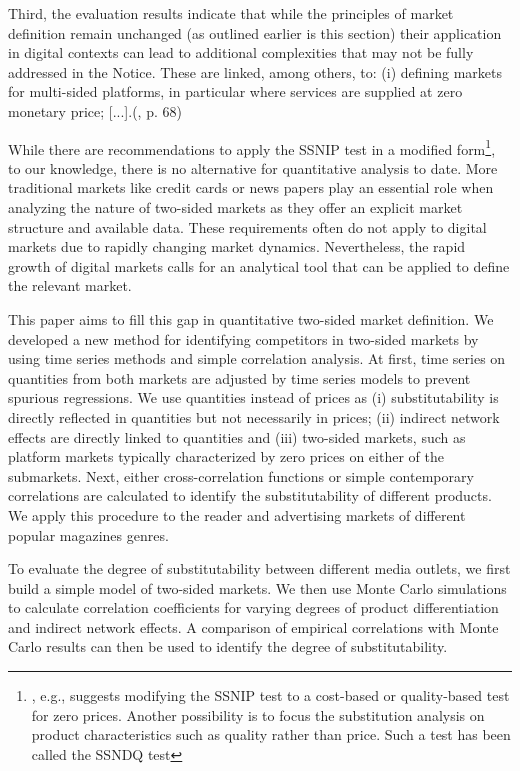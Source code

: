 \documentclass[12pt,a4paper,notitlepage]{article}
\begin{document}
\begin{displayquote}
Third, the evaluation results indicate that while the principles of market definition remain unchanged (as outlined earlier is this section) their application in digital contexts can lead to additional complexities that may not be fully addressed in the Notice. These are linked, among others, to: (i) defining markets for multi-sided platforms, in particular where services are supplied at zero monetary price; [...].(\citet{europeancommission_evaluation_2021}, p. 68)
\end{displayquote}

While there are recommendations to apply the SSNIP test in a modified form\footnote{\citet{newman_antitrust_2015}, e.g., suggests modifying the SSNIP test to a cost-based or quality-based test for zero prices. Another possibility is to focus the substitution analysis on product characteristics such as quality rather than price. Such a test has been called the SSNDQ test}, to our knowledge, there is no alternative for quantitative analysis to date. More traditional markets like credit cards or news papers play an essential role when analyzing the nature of two-sided markets as they offer an explicit market structure and available data. These requirements often do not apply to digital markets due to rapidly changing market dynamics. Nevertheless, the rapid growth of digital markets calls for an analytical tool that can be applied to define the relevant market.

This paper aims to fill this gap in quantitative two-sided market definition. We developed a new method for identifying competitors in two-sided markets by using time series methods and simple correlation analysis. At first, time series on quantities from both markets are adjusted by time series models to prevent spurious regressions. We use quantities instead of prices as (i) substitutability is directly reflected in quantities but not necessarily in prices; (ii) indirect network effects are directly linked to quantities and (iii) two-sided markets, such as platform markets typically characterized by zero prices on either of the submarkets. Next, either cross-correlation functions or simple contemporary correlations are calculated to identify the substitutability of different products. We apply this procedure to the reader and advertising markets of different popular magazines genres. 

To evaluate the degree of substitutability between different media outlets, we first build a simple model of two-sided markets. We then use Monte Carlo simulations to calculate correlation coefficients for varying degrees of product differentiation and indirect network effects. A comparison of empirical correlations with Monte Carlo results can then be used to identify the degree of substitutability. 
\end{document}
